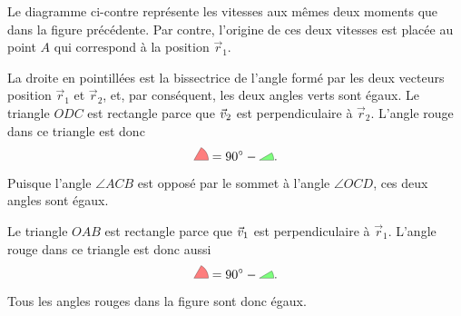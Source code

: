 Le diagramme ci-contre représente les vitesses aux mêmes deux moments que dans
la figure précédente.  Par contre, l'origine de ces deux vitesses est placée au
point $A$ qui correspond à la position $\vec{r}_1$.
\begin{marginfigure}
\end{marginfigure}
La droite en pointillées est la bissectrice de l'angle formé par les deux
vecteurs position $\vec{r}_1$ et $\vec{r}_2$, et, par conséquent, les deux
angles verts sont égaux.  Le triangle $ODC$ est rectangle parce que $\vec{v}_2$ est
perpendiculaire à $\vec{r}_2$.  L'angle rouge dans ce triangle est donc
\[
  \tikz{\filldraw[fill=red, opacity=0.5]
          (0, 0) -- (0.4, 0) arc (0:60:0.4) -- cycle;} = 
  \SI{90}{\degree} -
  \tikz{\filldraw[fill=green, opacity=0.5]
          (0, 0) -- (0.4, 0) arc (0:30:0.4) -- cycle;}.
\]
Puisque l'angle $\angle ACB$ est opposé par le sommet à l'angle $\angle OCD$,
ces deux angles sont égaux.

Le triangle $OAB$ est rectangle parce que $\vec{v}_1$ est
perpendiculaire à $\vec{r}_1$.  L'angle rouge dans ce triangle est donc aussi
\[
  \tikz{\filldraw[fill=red, opacity=0.5]
          (0, 0) -- (0.4, 0) arc (0:60:0.4) -- cycle;} = 
  \SI{90}{\degree} -
  \tikz{\filldraw[fill=green, opacity=0.5]
          (0, 0) -- (0.4, 0) arc (0:30:0.4) -- cycle;}.
\]
Tous les angles rouges dans la figure sont donc égaux.

